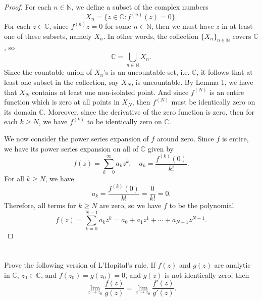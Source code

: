 \documentclass[12pt]{article}
\newenvironment{problem}
    {\begin{lrbox}{\mybox}\begin{minipage}{0.98\textwidth}}
    {\end{minipage}\end{lrbox}\framebox[\textwidth]{\usebox{\mybox}}}
\newcommand{\N}{\mathbb{N}}
\newcommand{\C}{\mathbb{C}}
\begin{document}
\begin{proof}
    For each $n \in \N$, we define a subset of the complex numbers
    \[
        X_n = \{z \in \C : f^{(n)}(z) = 0\}.
    \]
    For each $z \in \C$, since $f^{(n)}{z} = 0$ for some $n \in \N$, then we must have $z$ in at least one of these subsets, namely $X_n$. In other words, the collection $\{X_n\}_{n\in\N}$ covers $\C$, so
    \[
        \C = \bigcup_{n \in \N} X_n.
    \]
    Since the countable union of $X_n$'s is an uncountable set, i.e. $\C$, it follows that at least one subset in the collection, say $X_N$, is uncountable. By Lemma 1, we have that $X_N$ contains at least one non-isolated point. And since $f^{(N)}$ is an entire function which is zero at all points in $X_N$, then $f^{(N)}$ must be identically zero on its domain $\C$. Moreover, since the derivative of the zero function is zero, then for each $k \geq N$, we have $f^{(k)}$ to be identically zero on $\C$.
    
    We now consider the power series expansion of $f$ around zero. Since $f$ is entire,  we have its power series expansion on all of $\C$ given by
    \[
        f(z) = \sum_{k = 0}^\infty a_k z^k, \quad a_k = \frac{f^{(k)}(0)}{k!}.
    \]
    For all $k \geq N$, we have 
    \[
        a_k = \frac{f^{(k)}(0)}{k!} = \frac{0}{k!} = 0.
    \]
    Therefore, all terms for $k \geq N$ are zero, so we have $f$ to be the polynomial
    \[
        f(z) = \sum_{k = 0}^{N - 1} a_k z^k = a_0 + a_1 z^1 + \cdots + a_{N-1} z^{N-1}.
    \]
    
    
    
\end{proof}

\newpage
\section{}
\begin{problem}
    Prove the following version of L'Hopital's rule. If $f(z)$ and $g(z)$ are analytic in $\C$, $z_0 \in \C$, and $f(z_0) = g(z_0) = 0$, and $g(z)$ is not identically zero, then
    \[
        \lim_{z \to z_0} \frac{f(z)}{g(z)} = \lim_{z \to z_0} \frac{f'(z)}{g'(z)}.
    \]
\end{problem}
\end{document}
